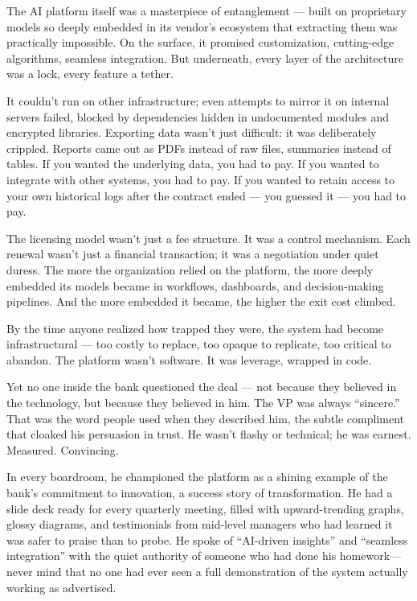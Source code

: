 The AI platform itself was a masterpiece of entanglement --- built on proprietary models so deeply embedded in its vendor’s ecosystem that extracting them was practically impossible. On the surface, it promised customization, cutting-edge algorithms, seamless integration. But underneath, every layer of the architecture was a lock, every feature a tether.

It couldn’t run on other infrastructure; even attempts to mirror it on internal servers failed, blocked by dependencies hidden in undocumented modules and encrypted libraries. Exporting data wasn’t just difficult: it was deliberately crippled. Reports came out as PDFs instead of raw files, summaries instead of tables. If you wanted the underlying data, you had to pay. If you wanted to integrate with other systems, you had to pay. If you wanted to retain access to your own historical logs after the contract ended --- you guessed it --- you had to pay.

The licensing model wasn’t just a fee structure. It was a control mechanism. Each renewal wasn’t just a financial transaction; it was a negotiation under quiet duress. The more the organization relied on the platform, the more deeply embedded its models became in workflows, dashboards, and decision-making pipelines. And the more embedded it became, the higher the exit cost climbed.

By the time anyone realized how trapped they were, the system had become infrastructural --- too costly to replace, too opaque to replicate, too critical to abandon. The platform wasn’t software. It was leverage, wrapped in code.

Yet no one inside the bank questioned the deal --- not because they believed in the technology, but because they believed in him. The VP was always “sincere.” That was the word people used when they described him, the subtle compliment that cloaked his persuasion in trust. He wasn’t flashy or technical; he was earnest. Measured. Convincing.

In every boardroom, he championed the platform as a shining example of the bank’s commitment to innovation, a success story of transformation. He had a slide deck ready for every quarterly meeting, filled with upward-trending graphs, glossy diagrams, and testimonials from mid-level managers who had learned it was safer to praise than to probe. He spoke of “AI-driven insights” and “seamless integration” with the quiet authority of someone who had done his homework—never mind that no one had ever seen a full demonstration of the system actually working as advertised.

